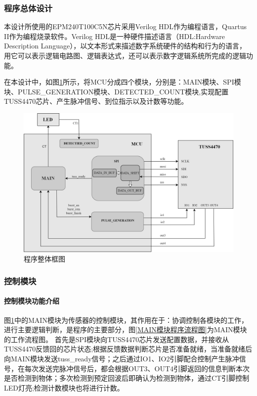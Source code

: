     \subsubsection{程序总体设计}
    本设计所使用的EPM240T100C5N芯片采用Verilog HDL作为编程语言，Quartus II作为编程烧录软件。Verilog HDL是一种硬件描述语言（HDL:Hardware Description Language），以文本形式来描述数字系统硬件的结构和行为的语言，用它可以表示逻辑电路图、逻辑表达式，还可以表示数字逻辑系统所完成的逻辑功能。\par
    在本设计中，如图\ref{程序整体框图}所示，将MCU分成四个模块，分别是：MAIN模块、SPI模块、PULSE\_GENERATION模块、DETECTED\_COUNT模块,实现配置TUSS4470芯片、产生脉冲信号、到位指示以及计数等功能。
    
         \begin{figure}[ht]
        \centering
        \includegraphics[width=12cm]{figure/Overall program block diagram.png}
        \caption{程序整体框图}
        \label{程序整体框图}
    \end{figure}
    
    \subsubsection{控制模块}
    
     \noindent
    \paragraph{控制模块功能介绍}
    图\ref{程序整体框图}中的MAIN模块为传感器的控制模块，其作用在于：协调控制各模块的工作，进行主要逻辑判断，是程序的主要部分，图\ref{MAIN模块程序流程图}为MAIN模块的工作流程图。
    首先是SPI模块向TUSS4470芯片发送配置数据，并接收从TUSS4470反馈回的芯片状态;根据反馈数据判断芯片是否准备就绪，当准备就绪后向MAIN模块发送tuss\_ready信号；之后通过IO1、IO2引脚配合控制产生脉冲信号，在每次发送完脉冲信号后，都会根据OUT3、OUT4引脚返回的信息判断本次是否检测到物体；多次检测到预定回波后即确认为检测到物体，通过CT引脚控制LED灯亮;检测计数模块也将进行计数。
    
